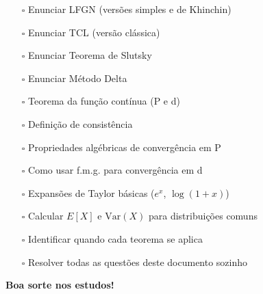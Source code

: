 \documentclass[12pt,a4paper]{article}
\theoremstyle{definition}
\theoremstyle{remark}
\begin{document}
\begin{itemize}
    \item[$\square$] Enunciar LFGN (versões simples e de Khinchin)
    \item[$\square$] Enunciar TCL (versão clássica)
    \item[$\square$] Enunciar Teorema de Slutsky
    \item[$\square$] Enunciar Método Delta
    \item[$\square$] Teorema da função contínua (P e d)
    \item[$\square$] Definição de consistência
    \item[$\square$] Propriedades algébricas de convergência em P
    \item[$\square$] Como usar f.m.g. para convergência em d
    \item[$\square$] Expansões de Taylor básicas ($e^x$, $\log(1+x)$)
    \item[$\square$] Calcular $E[X]$ e $\text{Var}(X)$ para distribuições comuns
    \item[$\square$] Identificar quando cada teorema se aplica
    \item[$\square$] Resolver todas as questões deste documento sozinho
\end{itemize}

\vspace{1cm}

\textbf{Boa sorte nos estudos!}
\end{document}
